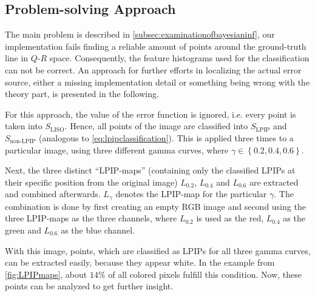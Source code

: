 \clearpage

\subsection{Problem-solving Approach}
\label{subsec:problemsolving}

The main problem is described in \autoref{subsec:examinationofbayesianinf}, our implementation fails finding a reliable amount of points around the ground-truth line in $Q$-$R$ space. Consequently, the feature histograms used for the classification can not be correct. An approach for further efforts in localizing the actual error source, either a missing implementation detail or something being wrong with the theory part, is presented in the following.

For this approach, the value of the error function is ignored, \hbox{i.e.} every point is taken into $S_\text{LISO}$. Hence, all points of the image are classified into $S_\text{LPIP}$ and $S_\text{non-LPIP}$ (analogous to \autoref{eq:lpipclassification}). This is applied three times to a particular image, using three different gamma curves, where $\gamma \in \left\{0.2, 0.4, 0.6\right\}$. 

Next, the three distinct ``LPIP-maps'' (containing only the classified LPIPs at their specific position from the original image) $L_{0.2}$, $L_{0.4}$ and $L_{0.6}$ are extracted and combined afterwards. $L_{\gamma}$ denotes the LPIP-map for the particular $\gamma$. The combination is done by first creating an empty RGB image and second using the three LPIP-maps as the three channels, where $L_{0.2}$ is used as the red, $L_{0.4}$ as the green and $L_{0.6}$ as the blue channel. 

With this image, points, which are classified as LPIPs for all three gamma curves, can be extracted easily, because they appear white. In the example from \autoref{fig:LPIPmaps}, about $14 \%$ of all colored pixels fulfill this condition. Now, these points can be analyzed to get further insight.

\vspace{0.7cm}

